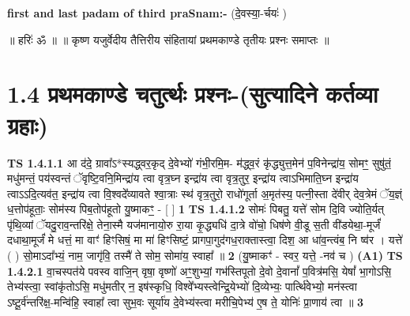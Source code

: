 \documentclass[17pt]{extarticle}
\begin{document}
        \textbf{first and last padam of third praSnam:-} \newline
        (दे॒वस्या॒-र्चयः॑ ) \newline 

        
        ॥ हरिः॑ ॐ ॥
॥ कृष्ण यजुर्वेदीय तैत्तिरीय संहितायां प्रथमकाण्डे तृतीयः प्रश्नः समाप्तः ॥ \newline
        \pagebreak
                \pagebreak
        
     \section*{ 1.4     प्रथमकाण्डे चतुर्त्थः प्रश्नः-(सुत्यादिने कर्तव्या ग्रहाः) }
                                        \textbf{ TS 1.4.1.1} \newline
                  आ द॑दे॒ ग्रावा᳚ऽ*स्यद्ध्वर॒कृद् दे॒वेभ्यो॑ गंभी॒रमि॒म- म॑द्ध्व॒रं कृ॑द्ध्युत्त॒मेन॑ प॒विनेन्द्रा॑य॒ सोमꣳ॒॒ सुषु॑तं॒ मधु॑मन्तं॒ पय॑स्वन्तं ॅवृष्टि॒वनि॒मिन्द्रा॑य त्वा वृत्र॒घ्न इन्द्रा॑य त्वा वृत्र॒तुर॒ इन्द्रा॑य त्वाऽभिमाति॒घ्न इन्द्रा॑य त्वाऽऽदि॒त्यव॑त॒ इन्द्रा॑य त्वा वि॒श्वदे᳚व्यावते श्वा॒त्राः स्थ॑ वृत्र॒तुरो॒ राधो॑गूर्ता अ॒मृत॑स्य॒ पत्नी॒स्ता दे॑वीर् देव॒त्रेमं ॅय॒ज्ञ्ं ध॒त्तोप॑हूताः॒ सोम॑स्य पिब॒तोप॑हूतो यु॒ष्माकꣳ॒॒ - [ ] \textbf{  1} \newline
                  \newline
                                \textbf{ TS 1.4.1.2} \newline
                  सोमः॑ पिबतु॒ यत्ते॑ सोम दि॒वि ज्योति॒र्यत् पृ॑थि॒व्यां ॅयदु॒राव॒न्तरि॑क्षे॒ तेना॒स्मै यज॑मानायो॒रु रा॒या कृ॒द्ध्यधि॑ दा॒त्रे वो॑चो॒ धिष॑णे वी॒डू स॒ती वी॑डयेथा॒-मूर्जं॑ दधाथा॒मूर्जं॑ मे धत्तं॒ मा वाꣳ॑ हिꣳसिषं॒ मा मा॑ हिꣳसिष्टं॒ प्रागपा॒गुद॑गध॒राक्तास्त्वा॒ दिश॒ आ धा॑व॒न्त्वंब॒ नि ष्व॑र । यत्ते॑ ( ) सो॒माऽदा᳚भ्यं॒ नाम॒ जागृ॑वि॒ तस्मै॑ ते सोम॒ सोमा॑य॒ स्वाहा᳚ ॥ \textbf{  2 } \newline
                  \newline
                      (यु॒ष्माकꣳ॑ - स्वर॒ यत्ते॒ -नव॑ च )  \textbf{(A1)} \newline \newline
                                        \textbf{ TS 1.4.2.1} \newline
                  वा॒चस्पत॑ये पवस्व वाजि॒न् वृषा॒ वृष्णो॑ अꣳ॒॒शुभ्यां॒ गभ॑स्तिपूतो दे॒वो दे॒वानां᳚ प॒वित्र॑मसि॒ येषां᳚ भा॒गोऽसि॒ तेभ्य॑स्त्वा॒ स्वांकृ॑तोऽसि॒ मधु॑मतीर् न॒ इष॑स्कृधि॒ विश्वे᳚भ्यस्त्वेन्द्रि॒येभ्यो॑ दि॒व्येभ्यः॒ पार्त्थि॑वेभ्यो॒ मन॑स्त्वा ऽष्टू॒र्व॑न्तरि॑क्ष॒-मन्वि॑हि॒ स्वाहा᳚ त्वा सुभ॒वः सूर्या॑य दे॒वेभ्य॑स्त्वा मरीचि॒पेभ्य॑ ए॒ष ते॒ योनिः॑ प्रा॒णाय॑ त्वा ॥ \textbf{  3 } \newline
\end{document}
